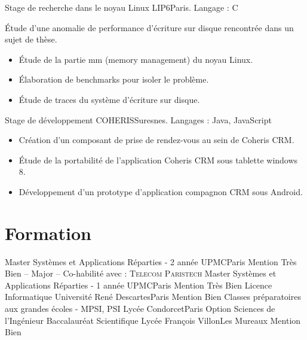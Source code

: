 \documentclass[11pt,a4paper,sans]{moderncv}
\begin{document}
\vspace{1em}

        {Stage de recherche dans le noyau Linux}
        {LIP6}{Paris. Langage : C}{}
        {
            \'Etude d'une anomalie de performance d'écriture sur disque rencontrée dans un sujet de thèse.
            \begin{itemize}
                \item\'Etude de la partie mm (memory management) du noyau Linux.
                \item\'Elaboration de benchmarks pour isoler le problème.
                \item\'Etude de traces du système d'écriture sur disque.
            \end{itemize}
        }

\vspace{1em}

        {Stage de développement}
        {COHERIS}{Suresnes. Langages : Java, JavaScript}{}
        {
            \begin{itemize}
                \item Création d'un composant de prise de rendez-vous au sein de Coheris CRM.
                \item\'Etude de la portabilité de l'application Coheris CRM sous tablette windows 8.
                \item Développement d'un prototype d'application compagnon CRM sous Android.
            \end{itemize}
        }

\vspace{0.5em}


\section{Formation}
\vspace{1em}

        {Master Systèmes et Applications Réparties - 2 année}
        {UPMC}{Paris}{}
        {Mention Très Bien -- Major -- Co-habilité avec : \textsc{Telecom Paristech}}
        {Master Systèmes et Applications Réparties - 1 année}
        {UPMC}{Paris}{}
        {Mention Très Bien}
        {Licence Informatique}
        {Université René Descartes}{Paris}{}
        {Mention Bien}
        {Classes préparatoires aux grandes écoles - MPSI, PSI\up{*}}
        {Lycée Condorcet}{Paris}{}
        {Option Sciences de l'Ingénieur}
        {Baccalauréat Scientifique}
        {Lycée François Villon}{Les Mureaux}{}
        {Mention Bien}
\end{document}
